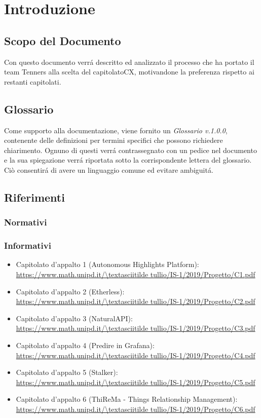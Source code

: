 \section{Introduzione}

\subsection{Scopo del Documento}
Con questo documento verr\'a descritto ed analizzato il processo che ha portato il team Tenners alla scelta del capitolato\glo CX, motivandone la preferenza rispetto ai restanti capitolati.
	
\subsection{Glossario}
Come supporto alla documentazione, viene fornito un \textit{Glossario v.1.0.0}, contenente delle definizioni per termini specifici che possono richiedere chiarimento. Ognuno di questi verr\'a contrassegnato con un pedice \glo nel documento e la sua spiegazione verr\'a riportata sotto la corrispondente lettera del glossario. Ci\`o consentir\'a di avere un linguaggio comune ed evitare ambiguit\'a. 
	
\subsection{Riferimenti}
\subsubsection{Normativi}
\subsubsection{Informativi}
\begin{itemize}
    \item Capitolato d'appalto 1 (Autonomous Highlights Platform):\\ 
    \url{https://www.math.unipd.it/\textasciitilde tullio/IS-1/2019/Progetto/C1.pdf}
    \item Capitolato d'appalto 2 (Etherless):\\ 
	\url{https://www.math.unipd.it/\textasciitilde tullio/IS-1/2019/Progetto/C2.pdf}
    \item Capitolato d'appalto 3 (NaturalAPI):\\ 
    \url{https://www.math.unipd.it/\textasciitilde tullio/IS-1/2019/Progetto/C3.pdf}
    \item Capitolato d'appalto 4 (Predire in Grafana):\\ 
    \url{https://www.math.unipd.it/\textasciitilde tullio/IS-1/2019/Progetto/C4.pdf}
    \item Capitolato d'appalto 5 (Stalker):\\ 
    \url{https://www.math.unipd.it/\textasciitilde tullio/IS-1/2019/Progetto/C5.pdf}
    \item Capitolato d'appalto 6 (ThiReMa - Things Relationship Management):\\ 
    \url{https://www.math.unipd.it/\textasciitilde tullio/IS-1/2019/Progetto/C6.pdf}
\end{itemize}

	
	

